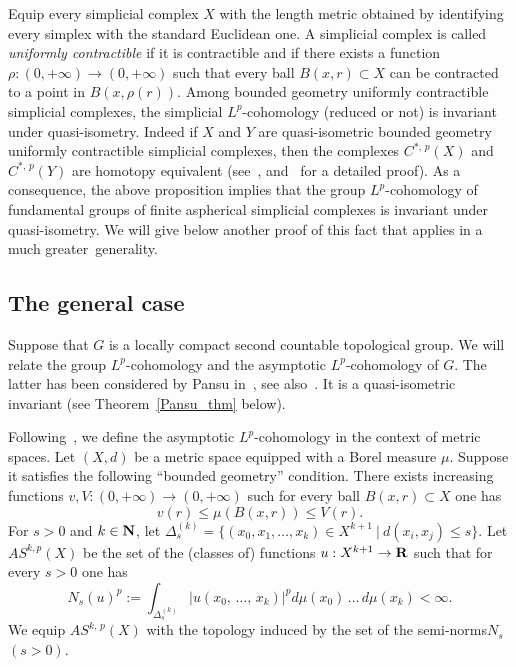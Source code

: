 \begin{rema}\label{simplicial_remark}
Equip every simplicial complex $X$ with the length metric obtained by identifying every simplex with the standard
Euclidean one. A simplicial complex is called \emph{uniformly contractible} if it is contractible and if there exists a function $\rho: (0, +\infty) \to (0, +\infty)$ such that every ball $B(x,r) \subset X$ can be contracted to a point in $B(x,\rho (r))$. Among bounded geometry uniformly contractible simplicial complexes, the simplicial $L^p$-cohomology (reduced or not) is invariant under quasi-isometry. Indeed if $X$ and $Y$ are quasi-isometric bounded geometry uniformly contractible simplicial complexes, then the complexes $C^{*,\,p}(X)$ and $C^{*,\,p}(Y)$ are homotopy equivalent (see~\cite[p.~219]{G}, and~\cite{BP2} for a detailed proof). As a consequence, the above proposition implies that the group $L^p$-cohomology of fundamental groups of finite aspherical simplicial complexes is invariant under quasi-isometry. We will give below another proof of this fact that applies in a much greater~generality.
\end{rema}


\subsection*{The general case}
Suppose that $G$ is a locally compact second countable topological group. We will relate the group $L^p$-cohomology and the asymptotic $L^p$-cohomology of $G$. The latter has been considered by Pansu in~\cite{Pa95}, see also~\cite{Genton}. It is a quasi-isometric invariant (see Theorem~\ref{Pansu_thm} below).

Following~\cite{Pa95}, we define the asymptotic $L^p$-cohomology in the context of metric spaces. Let $(X, d)$ be a metric space equipped with a Borel measure $\mu$. Suppose it satisfies the following ``bounded geometry'' condition. There exists increasing functions $v, V: (0, +\infty) \to (0, +\infty)$ such for every ball $B(x, r) \subset X$ one has
\[
v(r) \leqslant \mu (B(x,r)) \leqslant V(r).
\]
For $s >0$ and $k\in {\bf N}$, let $\Delta _s ^{(k)} = \{(x_0, x_1,\dots, x_k) \in X ^{k+1}~\vert~d(x_i, x_j) \leqslant s\}$. Let $AS^{k,p}(X)$ be the set of the (classes of) functions $u: X^{k+1} \to {\bf R}$ such that for every $s >0$ one has
\[
N_s (u)^p:= \int _{\Delta _s ^{(k)}} \vert u (x_0,\,\dots,\,x_k)\vert ^p d\mu(x_0)\,\dots\, d\mu (x_k) < \infty.
\]
We equip $AS^{k,\,p}(X)$ with the topology induced by the set of the semi-norms\linebreak$N_s$ $(s>0)$.

